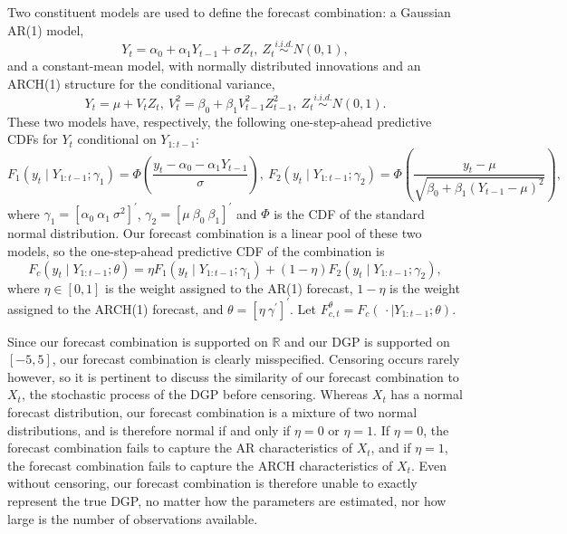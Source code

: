 \documentclass[12pt]{article}
\theoremstyle{definition}
\theoremstyle{remark}
\begin{document}
Two constituent models are used to define the forecast combination: a Gaussian AR(1) model, 
\begin{equation}
Y_t = \alpha_0 + \alpha_1 Y_{t-1} + \sigma Z_t,\ Z_t \overset{i.i.d.}{\sim} N(0, 1), \label{eqn:fmod1}
\end{equation}
and a constant-mean model, with normally distributed innovations and an ARCH(1) structure for the conditional variance, 
\begin{equation}
Y_t = \mu + V_t Z_t,\ V^2_t = \beta_0 + \beta_1 V^2_{t-1} Z^2_{t-1},\ Z_t \overset{i.i.d.}{\sim} N(0, 1). \label{eqn:fmod2}
\end{equation}
These two models have, respectively, the following one-step-ahead predictive CDFs for $Y_t$ conditional on $Y_{1:t-1}$: 
\begin{equation*}
\textstyle
F_1(y_t \mid Y_{1:t-1} ; \gamma_1) = \Phi \left( \frac{y_t - \alpha_0 - \alpha_1 Y_{t-1}}{\sigma} \right),\ F_2(y_t \mid Y_{1:t-1} ; \gamma_2) = \Phi \left( \frac{y_t - \mu}{\sqrt{\beta_0 + \beta_1 (Y_{t-1} - \mu)^2}} \right),
\end{equation*}
where $\gamma_1 = [ \alpha_0\ \alpha_1\ \sigma^2 ]^{\prime}$, $\gamma_2 = [ \mu\ \beta_0\ \beta_1 ]^{\prime}$ and $\Phi$ is the CDF of the standard normal distribution. Our forecast combination is a linear pool of these two models, so the one-step-ahead predictive CDF of the combination is 
\begin{equation}
F_c(y_t \mid Y_{1:t-1} ; \theta) = \eta F_1(y_t \mid Y_{1:t-1} ; \gamma_1) + (1 - \eta) F_2(y_t \mid Y_{1:t-1} ; \gamma_2),  \label{eqn:predcdfsim}
\end{equation}
where $\eta \in [0,1]$ is the weight assigned to the AR(1) forecast, $1-\eta$
is the weight assigned to the ARCH(1) forecast, and $\theta = [\eta\ \gamma^{\prime}]^{\prime}$. Let $F^{\theta}_{c,t} = F_c(\, \cdot \mid Y_{1:t-1} ; \theta)$.

Since our forecast combination is supported on $\mathbb{R}$ and our DGP is supported on $[-5, 5]$, our forecast combination is clearly misspecified. Censoring occurs rarely however, so it is pertinent to discuss the similarity of our forecast combination to $X_t$, the stochastic process of the DGP before censoring. Whereas $X_t$ has a normal forecast distribution, our forecast combination is a mixture of two normal distributions, and is therefore normal if and only if $\eta = 0$ or $\eta = 1$. If $\eta = 0$, the forecast combination fails to capture the AR characteristics of $X_t$, and if $\eta = 1$, the forecast combination fails to capture the ARCH characteristics of $X_t$. Even without censoring, our forecast combination is therefore unable to exactly represent the true DGP, no matter how the parameters are estimated, nor how large is the number of observations available.
\end{document}
